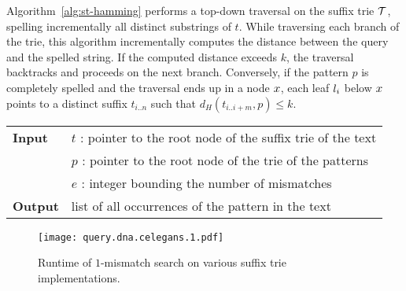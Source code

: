 Algorithm~\ref{alg:st-hamming} performs a top-down traversal on the suffix trie $\mathcal {T}$, spelling incrementally all distinct substrings of $t$.
While traversing each branch of the trie, this algorithm incrementally computes the distance between the query and the spelled string.
If the computed distance exceeds $k$, the traversal backtracks and proceeds on the next branch.
Conversely, if the pattern $p$ is completely spelled and the traversal ends up in a node $x$, each leaf $l_i$ below $x$ points to a distinct suffix $t_{i..n}$ such that $d_H(t_{i..i+m}, p) \leq k$.


\begin{figure*}[t]
\begin{center}
\begin{minipage}[t]{.8\textwidth}
\begin{algorithm}[H]
\begin{tabular}{ll}
\textbf{Input}  & $t$ : pointer to the root node of the suffix trie of the text\\
 			    & $p$ : pointer to the root node of the trie of the patterns\\
 			    & $e$ : integer bounding the number of mismatches\\
\textbf{Output} & list of all occurrences of the pattern in the text\\
\end{tabular}
\begin{algorithmic}[1]
		\State \Report {}
		\Repeat
			\State {}
			\State {}
			\State {}
		\Until {}
	\EndIf
\EndIf
\end{algorithmic}
\label{alg:st-hamming}
\end{algorithm}
\end{minipage}
\end{center}
\end{figure*}

\begin{figure}[t]
\begin{center}
\caption[$k$-mismatches runtime]{Runtime of $1$-mismatch search on various suffix trie implementations.}
\label{fig:query-dna-apx}
\texttt{[image: query.dna.celegans.1.pdf]}
\end{center}
\end{figure}

